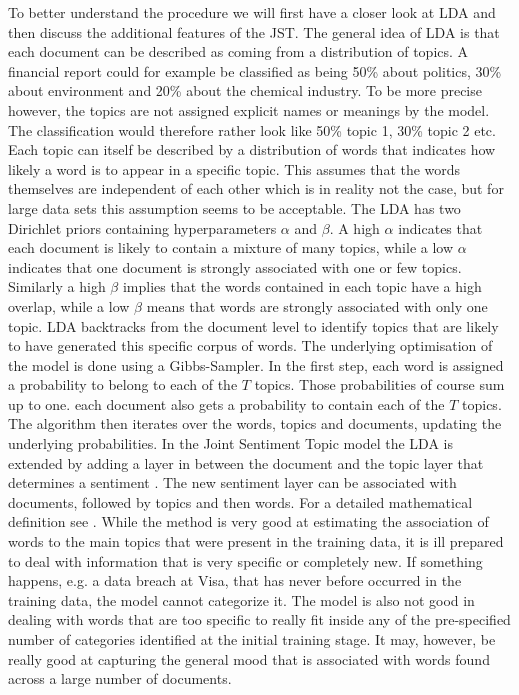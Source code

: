 To better understand the procedure we will first have a closer look at LDA and then discuss the additional features of the JST. 
The general idea of LDA is that each document can be described as coming from a distribution of topics. A financial report could for example be classified as being 50\% about politics, 30\% about environment and 20\% about the chemical industry. To be more precise however, the topics are not assigned explicit names or meanings by the model. The classification would therefore rather look like 50\% topic 1, 30\% topic 2 etc. Each topic can itself be described by a distribution of words \citep{blei2003latent} that indicates how likely a word is to appear in a specific topic. This assumes that the words themselves are independent of each other which is in reality not the case, but for large data sets this assumption seems to be acceptable. The LDA has two Dirichlet priors containing hyperparameters $\alpha$ and $\beta$. A high $\alpha$ indicates that each document is likely to contain a mixture of many topics, while a low $\alpha$ indicates that one document is strongly associated with one or few topics. Similarly a high $\beta$ implies that the words contained in each topic have a high overlap, while a low $\beta$ means that words are strongly associated with only one topic. LDA backtracks from the document level to identify topics that are likely to have generated this specific corpus of words. The underlying optimisation of the model is done using a Gibbs-Sampler. In the first step, each word is assigned a probability to belong to each of the $T$ topics. Those probabilities of course sum up to one. each document also gets a probability to contain each of the $T$ topics. The algorithm then iterates over the words, topics and documents, updating the underlying probabilities. In the Joint Sentiment Topic model the LDA is extended by adding a layer in between the document and the topic layer that determines a sentiment \citep{lin2009joint}. The new sentiment layer can be associated with documents, followed by topics and then words. For a detailed mathematical definition see \citet{lin2009joint}. While the method is very good at estimating the association of words to the main topics that were present in the training data, it is ill prepared to deal with information that is very specific or completely new. If something happens, e.g. a data breach at Visa, that has never before occurred in the training data, the model cannot categorize it. The model is also not good in dealing with words that are too specific to really fit inside any of the pre-specified number of categories identified at the initial training stage. It may, however, be really good at capturing the general mood that is associated with words found across a large number of documents. 


